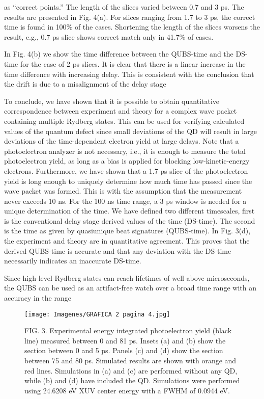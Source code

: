 \documentclass[7pt]{article}
\begin{document}
\begin{multicols}{2}

\small{}


as “correct points.” The length of the slices varied between
0.7 and 3 ps. The results are presented in Fig. 4(a). For slices
ranging from 1.7 to 3 ps, the correct time is found in 100\%
of the cases. Shortening the length of the slices worsens the
result, e.g., 0.7 ps slice shows correct match only in 41.7\% of
cases.

In Fig. 4(b) we show the time difference between the
QUBS-time and the DS-time for the case of 2 ps slices. It is
clear that there is a linear increase in the time difference with
increasing delay. This is consistent with the conclusion that
the drift is due to a misalignment of the delay stage

To conclude, we have shown that it is possible to obtain
quantitative correspondence between experiment and theory
for a complex wave packet containing multiple Rydberg
states. This can be used for verifying calculated values of the
quantum defect since small deviations of the QD will result in
large deviations of the time-dependent electron yield at large
delays. Note that a photoelectron analyzer is not necessary, i.e., it is enough to measure the total photoelectron yield, as
long as a bias is applied for blocking low-kinetic-energy electrons. Furthermore, we have shown that a 1.7 ps slice of the
photoelectron yield is long enough to uniquely determine how
much time has passed since the wave packet was formed. This
is with the assumption that the measurement never exceeds
10 ns. For the 100 ns time range, a 3 ps window is needed for
a unique determination of the time. We have defined two different timescales, first is the conventional delay stage derived
values of the time (DS-time). The second is the time as given
by quasiunique beat signatures (QUBS-time). In Fig. 3(d),
the experiment and theory are in quantitative agreement. This
proves that the derived QUBS-time is accurate and that any
deviation with the DS-time necessarily indicates an inaccurate
DS-time.

Since high-level Rydberg states can reach lifetimes of well
above microseconds, the QUBS can be used as an artifact-free
watch over a broad time range with an accuracy in the range

\end{multicols}

\begin{figure}[h]
    \centering
    \texttt{[image: Imagenes/GRAFICA 2 pagina 4.jpg]}
    \caption*{\small{FIG. 3. Experimental energy integrated photoelectron yield (black line) measured between 0 and 81 ps. Insets (a) and (b) show the section between 0 and 5 ps. Panels (c) and (d) show the section between 75 and 80 ps. Simulated results are shown with orange and red lines. Simulations in (a) and (c) are performed without any QD, while (b) and (d) have included the QD. Simulations were performed using 24.6208 eV XUV center energy with a FWHM of 0.0944 eV.
 }}
    \label{grafica 2 pagina 4}
\end{figure}
\end{document}
